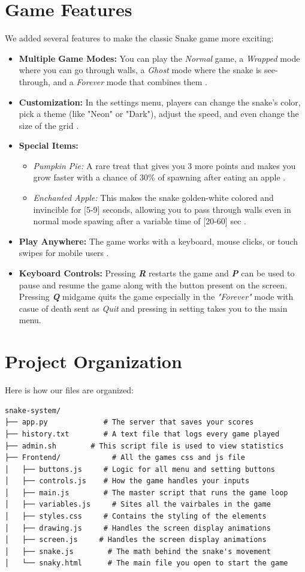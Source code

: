 \section{Game Features}
We added several features to make the classic Snake game more exciting:
\begin{itemize}
    \item \textbf{Multiple Game Modes:} You can play the \textit{Normal} game, a \textit{Wrapped} mode where you can go through walls, a \textit{Ghost} mode where the snake is see-through, and a \textit{Forever} mode that combines them .
    \item \textbf{Customization:} In the settings menu, players can change the snake's color, pick a theme (like "Neon" or "Dark"), adjust the speed, and even change the size of the grid .
    \item \textbf{Special Items:} 
    \begin{itemize}
        \item \textit{Pumpkin Pie:} A rare treat that gives you 3 more points and makes you grow faster with a chance of 30\% of spawning after eating an apple .
        \item \textit{Enchanted Apple:} This makes the snake golden-white colored and invincible for [5-9] seconds, allowing you to pass through walls even in normal mode spawing after a variable time of [20-60] sec  .
    \end{itemize}
    \item \textbf{Play Anywhere:} The game works with a keyboard, mouse clicks, or touch swipes for mobile users .
    \item \textbf{Keyboard Controls:} Pressing \textbf{\textit{R}} restarts the game and \textbf{\textit{P}} can be used to pause and resume the game along with the button present on the screen. Pressing \textbf{\textit{Q}} midgame quits the game especially in the \textit{"Forever"} mode with casue of death sent as \textit{Quit} and pressing in setting takes you to the main menu.
\end{itemize}

\section{Project Organization}
Here is how our files are organized:
\begin{lstlisting}
snake-system/
├── app.py             # The server that saves your scores
├── history.txt        # A text file that logs every game played 
├── admin.sh        # This script file is used to view statistics
├── Frontend/            # All the games css and js file
│   ├── buttons.js     # Logic for all menu and setting buttons 
│   ├── controls.js    # How the game handles your inputs 
│   ├── main.js        # The master script that runs the game loop 
│   ├── variables.js     # Sites all the vairbales in the game
│   ├── styles.css     # Contains the styling of the elements 
│   ├── drawing.js     # Handles the screen display animations  
│   ├── screen.js     # Handles the screen display animations 
│   ├── snake.js        # The math behind the snake's movement 
│   └── snaky.html      # The main file you open to start the game 
\end{lstlisting}

